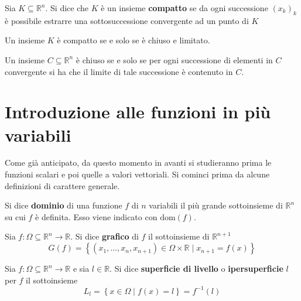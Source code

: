\begin{definition}
    Sia $K \subseteq \mathbb{R}^n$. Si dice che $K$ è un insieme \textbf{compatto} se da ogni successione $(x_k)_k$ è possibile estrarre una sottosuccessione convergente ad un punto di $K$
\end{definition}
\begin{theorem} \label{Teo: Heine Borel}
    Un insieme $K$ è compatto se e solo se è chiuso e limitato.
\end{theorem}
    \begin{oss}
        Un insieme $C \subseteq \mathbb{R}^n$ è chiuso se e solo se per ogni successione di elementi in $C$ convergente si ha che il limite di tale successione è contenuto in $C$.
    \end{oss}


\section{Introduzione alle funzioni in più variabili}
Come già anticipato, da questo momento in avanti si studieranno prima le funzioni scalari e poi quelle a valori vettoriali.
Si cominci prima da alcune definizioni di carattere generale. 
\begin{definition}
    Si dice \textbf{dominio} di una funzione $f$ di $n$ variabili il più grande sottoinsieme di $\mathbb{R}^n$ su cui $f$ è definita. Esso viene indicato con $\text{dom}(f)$.
\end{definition}
\begin{definition}
    Sia $f: \Omega \subseteq \mathbb{R}^n \to \mathbb{R}$. Si dice \textbf{grafico} di $f$ il sottoinsieme di $\mathbb{R}^{n+1}$
    \begin{equation*}
        G(f)= \left\{(x_1, \dots, x_n, x_{n+1}) \in \Omega \times \mathbb{R} \mid x_{n+1}=f(x)\right\}
    \end{equation*}
\end{definition}
\begin{definition}
    Sia $f:\Omega \subseteq \mathbb{R}^n \to \mathbb{R}$ e sia $l \in \mathbb{R}$. Si dice \textbf{superficie di livello} o \textbf{ipersuperficie} $l$ per $f$ il sottoinsieme
    \begin{equation*}
        L_l=\left\{x \in \Omega \mid f(x)=l\right\}=f^{-1}(l)
    \end{equation*}
\end{definition}

